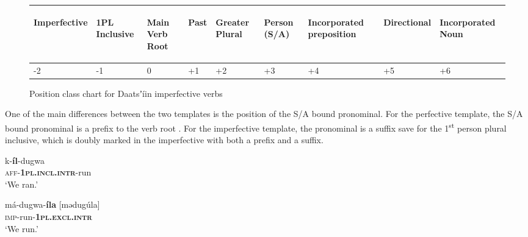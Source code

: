 \documentclass[output=paper]{langsci/langscibook}
\begin{document}
\begin{figure}
\begin{tabularx}{\textwidth}{XXXXXXXXX}
\begin{turn}{90} Imperfective \end{turn} & \begin{turn}{90} 1PL Inclusive \end{turn} & \begin{turn}{90} Main Verb Root \end{turn} & \begin{turn}{90} Past \end{turn} & \begin{turn}{90} Greater Plural \end{turn} & \begin{turn}{90} Person (S/A) \end{turn} & \begin{turn}{90} Incorporated preposition \end{turn} & \begin{turn}{90} Directional \end{turn} & \begin{turn}{90} Incorporated Noun \end{turn} \\ \midrule
\multicolumn{1}{X}{{}-2} & \multicolumn{1}{X}{{}-1} & \multicolumn{1}{X}{0} & \multicolumn{1}{X}{+1} & \multicolumn{1}{X}{+2} & \multicolumn{1}{X}{+3} & \multicolumn{1}{X}{+4} & \multicolumn{1}{X}{+5} & +6\\
\end{tabularx}
\caption{Position class chart for Daatsʼ\'{i}in imperfective verbs}
\label{fig:ahlandc:3}
\end{figure}

One of the main differences between the two templates is the position of the S/A bound pronominal. For the perfective template, the S/A bound pronominal is a prefix to the verb root . For the imperfective template, the pronominal is a suffix  save for the 1\textsuperscript{st} person plural inclusive, which is doubly marked in the imperfective with both a prefix and a suffix. 

\ea\label{ex:ahlandc:6}
\gll 
k-\textbf{\'{i}l}{}-dugwa \\
\textsc{aff}{}-\textbf{\textsc{1pl.incl.intr}}{}-run \\
\glt
‘We ran.’
\z

\ea\label{ex:ahlandc:7}
\gll 
m\'{a}-dugwa-\textbf{\'{i}la}   [mədug\'{u}la] \\
\textsc{imp}{}-run-\textbf{\textsc{1pl.excl.intr}} \\
\glt 
 ‘We run.’
\z
\end{document}
